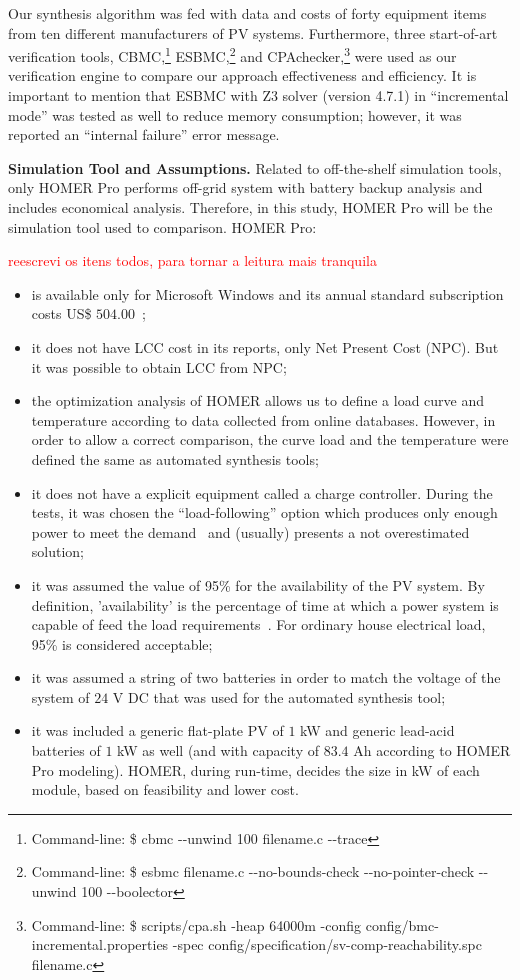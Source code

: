 \documentclass[runningheads]{llncs}
\begin{document}
Our synthesis algorithm was fed with data and costs of forty equipment items from ten different manufacturers of PV systems. Furthermore, three start-of-art verification tools, CBMC,\footnote{Command-line: \$ cbmc -\phantom{}-unwind 100 filename.c -\phantom{}-trace} ESBMC,\footnote{Command-line: \$ esbmc filename.c -\phantom{}-no-bounds-check -\phantom{}-no-pointer-check -\phantom{}-unwind 100 -\phantom{}-boolector} and CPAchecker,\footnote{Command-line: \$ scripts/cpa.sh -heap 64000m -config config/bmc-incremental.properties -spec config/specification/sv-comp-reachability.spc filename.c} were used as our verification engine to compare our approach effectiveness and efficiency. It is important to mention that ESBMC with Z3 solver (version 4.7.1) in ``incremental mode'' was tested as well to reduce memory consumption; however, it was reported an ``internal failure'' error message. %

\noindent \textbf{Simulation Tool and Assumptions.} Related to off-the-shelf simulation tools, only HOMER Pro performs off-grid system with battery backup analysis and includes economical analysis. Therefore, in this study, HOMER Pro will be the simulation tool used to comparison. HOMER Pro:

\textcolor{red}{reescrevi os itens todos, para tornar a leitura mais tranquila}
\begin{itemize}
\item is available only for Microsoft Windows and its annual standard subscription costs US\$ $504.00$~\cite{HOMER}; 
\item it does not have LCC cost in its reports, only Net Present Cost (NPC). But it was possible to obtain LCC from NPC; 
\item the optimization analysis of HOMER allows us to define a load curve and temperature according to data collected from online databases. However, in order to allow a correct comparison, the curve load and the temperature were defined the same as automated synthesis tools; 
\item it does not have a explicit equipment called a charge controller. During the tests, it was chosen the ``load-following'' option which produces only enough power to meet the demand~\cite{HOMER} and (usually) presents a not overestimated solution; 
\item it was assumed the value of 95\% for the availability of the PV system. By definition, 'availability' is the percentage of time at which a power system is capable of feed the load requirements~\cite{Khatib2014}. For ordinary house electrical load, 95\% is considered acceptable;
\item it was assumed a string of two batteries in order to match the voltage of the system of $24$ V DC that was used for the automated synthesis tool; 
\item it was included a generic flat-plate PV of $1$ kW and generic lead-acid batteries of $1$ kW as well (and with capacity of $83.4$ Ah according to HOMER Pro modeling). HOMER, during run-time, decides the size in kW of each module, based on feasibility and lower cost.
\end{itemize}
\end{document}
